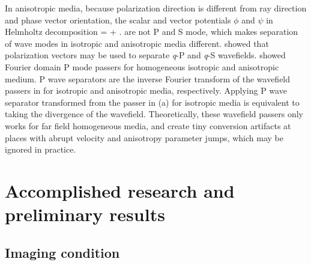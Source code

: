 In anisotropic media, because polarization direction is different from ray direction and phase vector orientation, the scalar and vector potentials $\phi$ and $\psi$ in Helmholtz decomposition 
\beq \label{eqn:helmholtz}
\uu = \GRAD{\phi} + \CURL{\psi} \;.
\eeq
are not P and S mode, which makes separation of wave modes in isotropic and anisotropic media different. \cite{GEO55-07-09140919} showed that polarization vectors may be used to separate \textit q-P and \textit q-S wavefields.  showed Fourier domain P mode passers for homogeneous isotropic and anisotropic medium. P wave separators are the inverse Fourier transform of the wavefield passers in  for isotropic and anisotropic media, respectively. Applying P wave separator transformed from the passer in (a) for isotropic media is equivalent to taking the divergence of the wavefield. Theoretically, these wavefield passers only works for far field homogeneous media, and create tiny conversion artifacts at places with abrupt velocity and anisotropy parameter jumps, which may be ignored in practice. 





%
\section{Accomplished research and preliminary results}

\subsection{Imaging condition}


